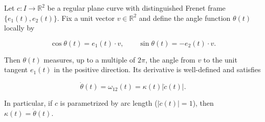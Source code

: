 Let $c: I \to \mathbb{R}^2$ be a regular plane curve with distinguished Frenet frame $\{e_1(t), e_2(t)\}$. Fix a unit vector $v \in \mathbb{R}^2$ and define the angle function $\theta(t)$ locally by

$$\cos \theta(t) = e_1(t) \cdot v, \qquad \sin \theta(t) = -e_2(t) \cdot v.$$

Then $\theta(t)$ measures, up to a multiple of $2\pi$, the angle from $v$ to the unit tangent $e_1(t)$ in the positive direction. Its derivative is well-defined and satisfies

$$\dot{\theta}(t) = \omega_{12}(t) = \kappa(t) |\dot{c}(t)|.$$

In particular, if $c$ is parametrized by arc length ($|\dot{c}(t)| = 1$), then $\kappa(t) = \dot{\theta}(t)$.
